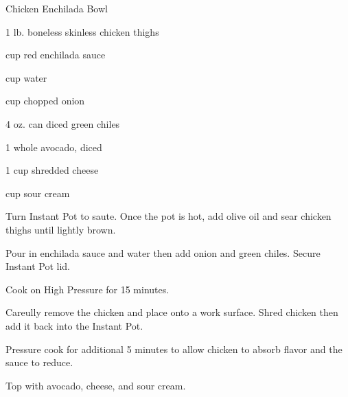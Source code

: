 \documentclass{cookbook}
\begin{document}
\begin{recipe}{Chicken Enchilada Bowl}

\begin{ingredients}
    \item 1 lb. boneless skinless chicken thighs
    \item {} cup red enchilada sauce
    \item {} cup water
    \item {} cup chopped onion
    \item 4 oz. can diced green chiles
    \item 1 whole avocado, diced
    \item 1 cup shredded cheese
    \item {} cup sour cream
\end{ingredients}

Turn Instant Pot to saute. Once the pot is hot, add olive oil and sear chicken thighs until lightly brown.

Pour in enchilada sauce and water then add onion and green chiles. Secure Instant Pot lid.

Cook on High Pressure for 15 minutes.

Careully remove the chicken and place onto a work surface. Shred chicken then add it back into the Instant Pot.

Pressure cook for additional 5 minutes to allow chicken to absorb flavor and the sauce to reduce.

Top with avocado, cheese, and sour cream.

\end{recipe}
\end{document}
